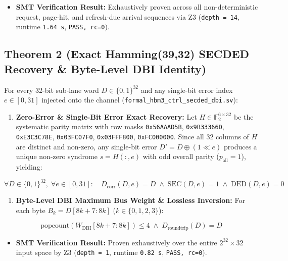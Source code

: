 \documentclass[journal,10pt,twocolumn]{IEEEtran}
\begin{document}
\begin{itemize}
  \item \textbf{SMT Verification Result:} Exhaustively proven across all non-deterministic request, page-hit, and refresh-due arrival sequences via Z3 (\texttt{depth = 14}, runtime \texttt{1.64 s}, \texttt{PASS, rc=0}).
\end{itemize}

\subsection{Theorem 2 (Exact Hamming(39,32) SECDED Recovery \& Byte-Level DBI Identity)}
For every 32-bit sub-lane word $D \in \{0,1\}^{32}$ and any single-bit error index $e \in [0, 31]$ injected onto the channel (\texttt{formal\_hbm3\_ctrl\_secded\_dbi.sv}):
\begin{enumerate}
  \item \textbf{Zero-Error \& Single-Bit Error Exact Recovery:} Let $H \in \mathbb{F}_2^{6 \times 32}$ be the systematic parity matrix with row masks \texttt{0x56AAAD5B}, \texttt{0x9B33366D}, \texttt{0xE3C3C78E}, \texttt{0x03FC07F0}, \texttt{0x03FFF800}, \texttt{0xFC000000}. Since all 32 columns of $H$ are distinct and non-zero, any single-bit error $D' = D \oplus (1 \ll e)$ produces a unique non-zero syndrome $s = H(:,e)$ with odd overall parity ($p_{\mathrm{all}} = 1$), yielding:
\end{enumerate}
$$\forall D \in \{0,1\}^{32},\; \forall e \in [0,31]:\quad D_{\mathrm{corr}}(D, e) = D \;\wedge\; \mathrm{SEC}(D,e) = 1 \;\wedge\; \mathrm{DED}(D,e) = 0$$
\begin{enumerate}
  \item \textbf{Byte-Level DBI Maximum Bus Weight \& Lossless Inversion:} For each byte $B_k = D[8k+7 : 8k]$ ($k \in \{0,1,2,3\}$):
\end{enumerate}
$$\mathrm{popcount}(W_{\mathrm{DBI}}[8k+7:8k]) \le 4 \;\wedge\; D_{\mathrm{roundtrip}}(D) = D$$

\begin{itemize}
  \item \textbf{SMT Verification Result:} Proven exhaustively over the entire $2^{32} \times 32$ input space by Z3 (\texttt{depth = 1}, runtime \texttt{0.82 s}, \texttt{PASS, rc=0}).
\end{itemize}
\end{document}
